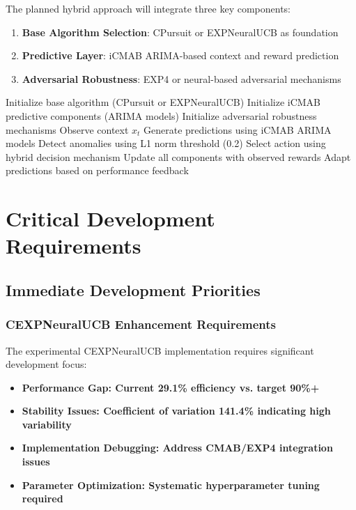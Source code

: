 \documentclass[12pt,a4paper]{article}
\newcommand{\critical}[1]{\textcolor{criticalcolor}{\textbf{#1}}}
\begin{document}
The planned hybrid approach will integrate three key components:

\begin{enumerate}
\item \textbf{Base Algorithm Selection}: CPursuit or EXPNeuralUCB as foundation
\item \textbf{Predictive Layer}: iCMAB ARIMA-based context and reward prediction
\item \textbf{Adversarial Robustness}: EXP4 or neural-based adversarial mechanisms
\end{enumerate}

\begin{algorithm}
\caption{Hybrid iCMAB-Enhanced Algorithm Framework}
\begin{algorithmic}[1]
\STATE Initialize base algorithm (CPursuit or EXPNeuralUCB)
\STATE Initialize iCMAB predictive components (ARIMA models)
\STATE Initialize adversarial robustness mechanisms
    \STATE Observe context $x_t$
    \STATE Generate predictions using iCMAB ARIMA models
    \STATE Detect anomalies using L1 norm threshold (0.2)
    \STATE Select action using hybrid decision mechanism
    \STATE Update all components with observed rewards
    \STATE Adapt predictions based on performance feedback
\ENDFOR
\end{algorithmic}
\end{algorithm}

\section{Critical Development Requirements}

\subsection{Immediate Development Priorities}

\subsubsection{CEXPNeuralUCB Enhancement Requirements}

The experimental CEXPNeuralUCB implementation requires significant development focus:

\begin{itemize}
\item \critical{\textbf{Performance Gap}: Current 29.1\% efficiency vs. target 90\%+}
\item \critical{\textbf{Stability Issues}: Coefficient of variation 141.4\% indicating high variability}
\item \critical{\textbf{Implementation Debugging}: Address CMAB/EXP4 integration issues}
\item \critical{\textbf{Parameter Optimization}: Systematic hyperparameter tuning required}
\end{itemize}
\end{document}
